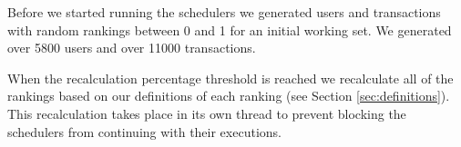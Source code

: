 

Before we started running the schedulers we generated users and transactions with random rankings between 0 and 1 for an initial working set. We generated over 5800 users and over 11000 transactions.

When the recalculation percentage threshold is reached we recalculate all of the rankings based on our definitions of each ranking (see Section \ref{sec:definitions}). This recalculation takes place in its own thread to prevent blocking the schedulers from continuing with their executions.